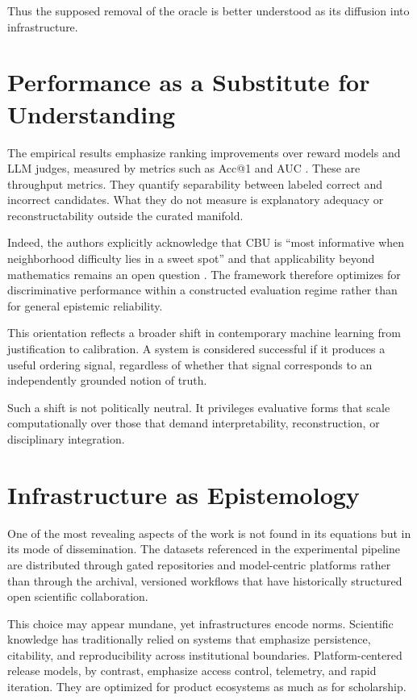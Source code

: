 \documentclass[12pt]{article}
\begin{document}
Thus the supposed removal of the oracle is better understood as its diffusion into infrastructure.

\section{Performance as a Substitute for Understanding}

The empirical results emphasize ranking improvements over reward models and LLM judges, measured by metrics such as Acc@1 and AUC \citep{son2026}. These are throughput metrics. They quantify separability between labeled correct and incorrect candidates. What they do not measure is explanatory adequacy or reconstructability outside the curated manifold.

Indeed, the authors explicitly acknowledge that CBU is ``most informative when neighborhood difficulty lies in a sweet spot'' and that applicability beyond mathematics remains an open question \citep{son2026}. The framework therefore optimizes for discriminative performance within a constructed evaluation regime rather than for general epistemic reliability.

This orientation reflects a broader shift in contemporary machine learning from justification to calibration. A system is considered successful if it produces a useful ordering signal, regardless of whether that signal corresponds to an independently grounded notion of truth.

Such a shift is not politically neutral. It privileges evaluative forms that scale computationally over those that demand interpretability, reconstruction, or disciplinary integration.

\section{Infrastructure as Epistemology}

One of the most revealing aspects of the work is not found in its equations but in its mode of dissemination. The datasets referenced in the experimental pipeline are distributed through gated repositories and model-centric platforms rather than through the archival, versioned workflows that have historically structured open scientific collaboration.

This choice may appear mundane, yet infrastructures encode norms. Scientific knowledge has traditionally relied on systems that emphasize persistence, citability, and reproducibility across institutional boundaries. Platform-centered release models, by contrast, emphasize access control, telemetry, and rapid iteration. They are optimized for product ecosystems as much as for scholarship.
\end{document}
